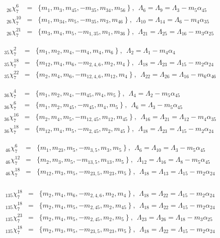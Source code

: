 \documentclass[a4paper]{jpconf}
\def\bb {\begin {eqnarray}}
\def\eqnn#1{\bb\label{#1}}
\def\eea {\end {eqnarray}}
\def\nn{\nonumber}
\def\a{\alpha}
\def\L{\Lambda}
\begin{document}
\eqnn{slt726}
       _{26}\chi^6_7 &=& \{ m_1, m_{3}, m_{45}, -m_{35}, m_{34}, m_{56} \   \} \ ,~~\L_6 = \L_9 = \L_3 - m_5 \a_{45} \\ %
  _{26}\chi^{10}_7 &=& \{ m_1, m_{34}, m_{5}, -m_{35}, m_{3}, m_{46} \   \} \ ,~~\L_{10} = \L_{14} =\L_6 - m_4 \a_{35}  \nn\\ %
 _{26}\chi^{21}_7 &=& \{ m_{3}, m_{4}, m_{5}, -m_{1,35}, m_{1}, m_{36} \   \} \ ,~~\L_{21} = \L_{25} =\L_{16} - m_3 \a_{25} \nn %
   \eea

\eqnn{slt735}
 _{35}\chi^2_7 &=& \{ m_1, m_2, m_{4}, -m_4, m_{4}, m_6 \   \} \ ,~~\L_2 = \L_1 - m_4 \a_4 \\ %
     _{35}\chi^{18}_7 &=& \{ m_{12}, m_{4}, m_{6}, -m_{2,4,6}, m_{2}, m_{4} \   \} \ ,~~\L_{18} = \L_{23} = \L_{15} - m_2 \a_{24}  \nn\\ %
 _{35}\chi^{22}_7 &=& \{ m_{2}, m_{4}, m_{6}, -m_{12,4,6}, m_{12}, m_{4} \   \} \ ,~~\L_{22} = \L_{26} = \L_{16} - m_6 \a_{46}  %
   \nn\eea %

\eqnn{slt736}
    _{36}\chi^4_7 &=& \{ m_1, m_2, m_{4}, -m_{45}, m_{4}, m_{5} \   \} \ ,~~\L_4 = \L_2 - m_5 \a_{45} \\ %
   _{36}\chi^6_7 &=& \{ m_1, m_{2}, m_{45}, -m_{45}, m_{4}, m_{5} \   \} \ ,~~\L_6 = \L_3 - m_5 \a_{45} \nn\\ %
 _{36}\chi^{16}_7 &=& \{ m_2, m_{4}, m_{5}, -m_{12,45}, m_{12}, m_{45} \   \} \ ,~~\L_{16} = \L_{21} = \L_{12} - m_4 \a_{35} \nn\\ %
  _{36}\chi^{18}_7 &=& \{ m_{12}, m_{4}, m_{5}, -m_{2,45}, m_{2}, m_{45} \   \} \ ,~~\L_{18} = \L_{23} = \L_{15} - m_2 \a_{24}
    \nn\eea %

 \eqnn{slt746}
 _{46}\chi^6_7 &=& \{ m_1, m_{23}, m_{5}, -m_{3,5}, m_{3}, m_{5} \   \} \ ,~~\L_6 = \L_{10} =\L_3 - m_5 \a_{45} \\ %
  _{46}\chi^{12}_7 &=& \{ m_2, m_{3}, m_{5}, -m_{13,5}, m_{13}, m_{5} \   \} \ ,~~\L_{12} = \L_{16} =\L_8 - m_5 \a_{45} \nn\\ %
  _{46}\chi^{18}_7 &=& \{ m_{12}, m_{3}, m_{5}, -m_{23,5}, m_{23}, m_{5} \   \} \ ,~~\L_{18} = \L_{13} =\L_{15} - m_2 \a_{24}  \nn\\ %
     \nn\eea %



     \eqnn{slt713456}
       _{135}\chi^{18}_7 &=& \{ m_{2}, m_{4}, m_{6}, -m_{2,4,6}, m_{2}, m_{4} \   \} \ ,~~\L_{18} = \L_{22} = \L_{15} - m_2 \a_{24}
          \\
          _{135}\chi^{18}_7 &=& \{ m_{2}, m_{4}, m_{5}, -m_{2,45}, m_{2}, m_{45} \   \} \ ,~~\L_{18} = \L_{22} = \L_{15} - m_2 \a_{24}  \nn\\ %
  _{135}\chi^{23}_7 &=& \{ m_{2}, m_{4}, m_{5}, -m_{2,45}, m_{2}, m_{5} \   \} \ ,~~\L_{23} = \L_{26} = \L_{18} - m_3 \a_{25}  \nn\\ %
             _{135}\chi^{18}_7 &=& \{ m_{2}, m_{3}, m_{5}, -m_{23,5}, m_{23}, m_{5} \   \} \ ,~~\L_{18} = \L_{22} = \L_{15} - m_2 \a_{24}
          \nn\eea %
\end{document}
